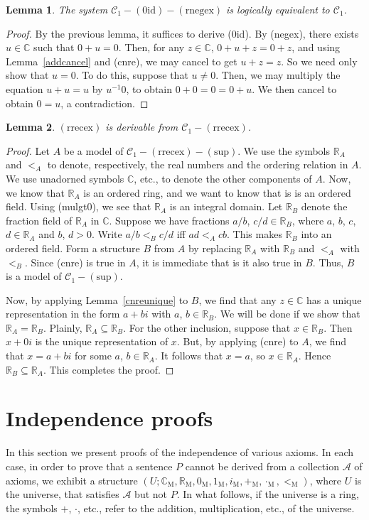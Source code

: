 \documentclass{article}
\newcommand\bC{\mathbb{C}}
\newcommand\bR{\mathbb{R}}
\newcommand\cA{\mathcal{A}}
\newcommand\cC{\mathcal{C}}
\newcommand\rM{\mathrm{M}}
\newtheorem{lemma}{Lemma}[section]
\begin{document}
\begin{lemma}
The system $\cC_1 - \mathrm{(0id)} - \mathrm{(rnegex)}$ is logically equivalent to $\cC_1$.
\end{lemma}
\begin{proof}
By the previous lemma, it suffices to derive (0id). By (negex), there exists $u \in \bC$ such that $0 + u = 0$. Then, for any $z \in \bC$, $0 + u + z = 0 + z$, and using Lemma~\ref{addcancel} and (cnre), we may cancel to get $u + z = z$. So we need only show that $u = 0$. To do this, suppose that $u \ne 0$. Then, we may multiply the equation $u + u = u$ by $u^{-1}0$, to obtain $0 + 0 = 0 = 0 + u$. We then cancel to obtain $0 = u$, a contradiction.
\end{proof}

\begin{lemma}
$\mathrm{(rrecex)}$ is derivable from $\cC_1 - \mathrm{(rrecex)}$.
\end{lemma}
\begin{proof}
Let $A$ be a model of $\cC_1 - \mathrm{(rrecex)} - \mathrm{(sup)}$. We use the symbols $\bR_A$ and $<_A$ to denote, respectively, the real numbers and the ordering relation in $A$. We use unadorned symbols $\bC$, etc., to denote the other components of $A$. Now, we know that $\bR_A$ is an ordered ring, and we want to know that is is an ordered field. Using (mulgt0), we see that $\bR_A$ is an integral domain. Let $\bR_B$ denote the fraction field of $\bR_A$ in $\bC$. Suppose we have fractions $a/b$, $c/d \in \bR_B$, where $a$, $b$, $c$, $d \in \bR_A$ and $b$, $d > 0$. Write $a/b <_B c/d$ if{}f $ad <_A cb$. This makes $\bR_B$ into an ordered field. Form a structure $B$ from $A$ by replacing $\bR_A$ with $\bR_B$ and $<_A$ with $<_B$. Since (cnre) is true in $A$, it is immediate that is it also true in $B$. Thus, $B$ is a model of $\cC_1 - \mathrm{(sup)}$.

Now, by applying Lemma~\ref{cnreunique} to $B$, we find that any $z \in \bC$ has a unique representation in the form $a + bi$ with $a$, $b \in \bR_B$. We will be done if we show that $\bR_A = \bR_B$. Plainly, $\bR_A \subseteq \bR_B$. For the other inclusion, suppose that $x \in \bR_B$. Then $x + 0i$ is the unique representation of $x$. But, by applying (cnre) to $A$, we find that $x = a + bi$ for some $a$, $b \in \bR_A$. It follows that $x = a$, so $x \in \bR_A$. Hence $\bR_B \subseteq \bR_A$. This completes the proof.

\end{proof}

\section{Independence proofs}
\label{independence}
In this section we present proofs of the independence of various axioms. In each case, in order to prove that a sentence $P$ cannot be derived from a collection $\cA$ of axioms, we exhibit a structure $(U; \bC_\rM, \bR_\rM, 0_\rM, 1_\rM, i_\rM, +_\rM, \cdot_\rM, <_\rM)$, where $U$ is the universe, that satisfies $\cA$ but not $P$. In what follows, if the universe is a ring, the symbols $+$, $\cdot$, etc., refer to the addition, multiplication, etc., of the universe.
\end{document}
